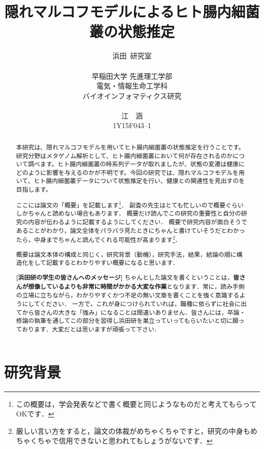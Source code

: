 \documentclass[dvipdfmx,autodetect-engine]{jsreport}
\title{隠れマルコフモデルによるヒト腸内細菌叢の状態推定}
\author{浜田~研究室\\
\\
早稲田大学 先進理工学部\\
電気・情報生命工学科\\ 
バイオインフォマティクス研究\\
\\
江　涵\\
1Y15F043–1
}
\begin{document}
\maketitle

\begin{abstract}
本研究は、隠れマルコフモデルを用いてヒト腸内細菌叢の状態推定を行うことです。研究分野はメタゲノム解析として、ヒト腸内細菌叢において何が存在されるのかについて調べます。ヒト腸内細菌叢の時系列データが取れましたが、状態の変遷は健康にどのように影響を与えるのかが不明です。今回の研究では、隠れマルコフモデルを用いて、ヒト腸内細菌叢データについて状態推定を行い、健康との関連性を見出すのを目指します。

\vspace{5mm}

ここには論文の「概要」を記載します\footnote{この概要は，学会発表などで書く概要と同じようなものだと考えてもらってOKです．}．
副査の先生はとても忙しいので概要ぐらいしかちゃんと読めない場合もあります．
概要だけ読んでこの研究の重要性と自分の研究の内容が伝わるように記載するようにしてください．
概要で研究内容が面白そうであることがわかり，論文全体をパラパラ見たときにちゃんと書けていそうだとわかったら，中身までちゃんと読んでくれる可能性が高まります\footnote{厳しい言い方をすると，論文の体裁がめちゃくちゃですと，研究の中身もめちゃくちゃで信用できないと思われてもしょうがないです．}．

概要は論文本体の構成と同じく，研究背景（動機），研究手法，結果，結論の順に構造化をして記載するとわかりやすい概要になると思います．

\vspace{10mm}

\textbf{[浜田研の学生の皆さんへのメッセージ]}
ちゃんとした論文を書くということは，\textbf{皆さんが想像しているよりも非常に時間がかかる大変な作業}となります．常に，読み手側の立場に立ちながら，わかりやすくかつ不足の無い文章を書くことを強く意識するようにしてください．
一方で，これが身につけられていれば，職種に依らずに社会に出てから皆さんの大きな「強み」になることは間違いありません．皆さんには，卒論・修論の執筆を通してこの部分を習得し浜田研を巣立っていってもらいたいと切に願っております．大変だとは思いますが頑張って下さい．


\end{abstract}

\setcounter{tocdepth}{2} %
\tableofcontents

\chapter{研究背景}
\end{document}

